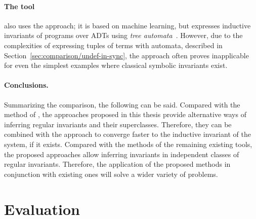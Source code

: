 \paragraph{The \rchc{} tool~\cite{haude2020,losekoot_et_al:LIPIcs.FSCD.2023.7}} also uses the \ice{} approach; it is based on machine learning, but expresses inductive invariants of programs over ADTs using \emph{tree automata}~\cite{tata}. However, due to the complexities of expressing tuples of terms with automata, described in Section~\ref{sec:comparison/undef-in-sync}, the approach often proves inapplicable for even the simplest examples where classical symbolic invariants exist.

\paragraph{Conclusions.} Summarizing the comparison, the following can be said. Compared with the method of \rchc{}, the approaches proposed in this thesis provide alternative ways of inferring regular invariants and their superclasses. Therefore, they can be combined with the \rchc{} approach to converge faster to the inductive invariant of the system, if it exists. Compared with the methods of the remaining existing tools, the proposed approaches allow inferring invariants in independent classes of regular invariants. Therefore, the application of the proposed methods in conjunction with existing ones will solve a wider variety of problems.

\section{Evaluation}
